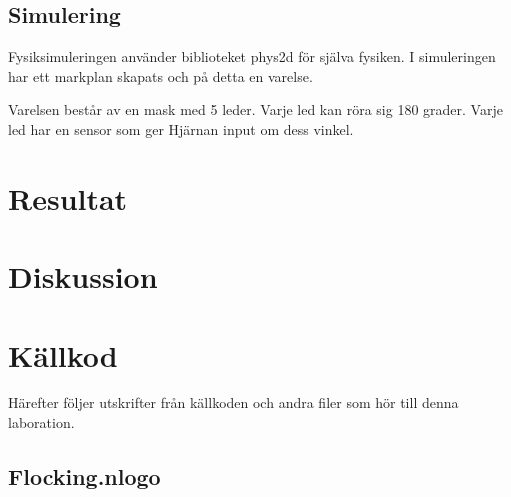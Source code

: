 \documentclass[titlepage, a4paper, 12pt]{article}
\begin{document}
	\subsection{Simulering}
		
	Fysiksimuleringen använder biblioteket phys2d för själva fysiken. I simuleringen har ett markplan skapats och på detta en varelse. 

	Varelsen består av en mask med 5 leder. Varje led kan röra sig 180 grader. Varje led har en sensor som ger Hjärnan input om dess vinkel. 

\section{Resultat}
\section{Diskussion}




\newpage
\appendix
{}
\section{Källkod}\label{sec:kallkod}
Härefter följer utskrifter från källkoden och andra filer som hör till
denna laboration.

\subsection{Flocking.nlogo}\label{app:Flocking.nlogo}
\begin{footnotesize}
  
\end{footnotesize}
\end{document}
